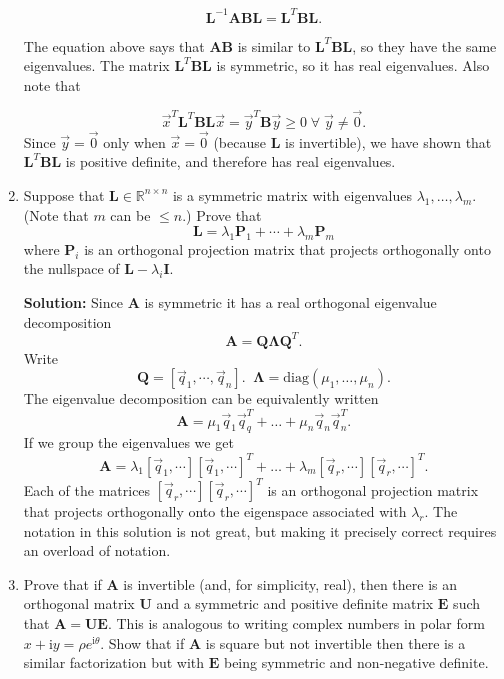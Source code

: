 \documentclass[11pt,fleqn]{article}
\newcommand{\imag}{\mathrm{i}}
\begin{document}
\begin{enumerate}
\[\mathbf{L}^{-1}\mathbf{ABL} = \mathbf{L}^T\mathbf{B}\mathbf{L}.\]

The equation above says that $\mathbf{AB}$ is similar to $\mathbf{L}^T\mathbf{B}\mathbf{L}$, so they have the same eigenvalues.
The matrix $\mathbf{L}^T\mathbf{B}\mathbf{L}$ is symmetric, so it has real eigenvalues. Also note that

\[\vec{x}^T\mathbf{L}^T\mathbf{B}\mathbf{L}\vec{x} = \vec{y}^T\mathbf{B}\vec{y}\ge0\;\forall\;\vec{y}\neq \vec{0}.\]
Since $\vec{y}=\vec{0}$ only when $\vec{x}=\vec{0}$ (because $\mathbf{L}$ is invertible), we have shown that $\mathbf{L}^T\mathbf{B}\mathbf{L}$ is positive definite, and therefore has real eigenvalues.

\item Suppose that $\mathbf{L}\in\mathbb{R}^{n\times n}$ is a symmetric matrix with eigenvalues $\lambda_1,\ldots,\lambda_m$. (Note that $m$ can be $\le n$.) Prove that
\[\mathbf{L} = \lambda_1 \mathbf{P}_1 + \cdots+\lambda_m\mathbf{P}_m\]
where $\mathbf{P}_i$ is an orthogonal projection matrix that projects orthogonally onto the nullspace of $\mathbf{L} - \lambda_i\mathbf{I}$.

{\bf Solution:} Since {\bf A} is symmetric it has a real orthogonal eigenvalue decomposition
\[\mathbf{A} = \mathbf{Q\Lambda Q}^T.\]
Write
\[\mathbf{Q} = [\vec{q}_1,\cdots,\vec{q}_n].\;\;\mathbf{\Lambda} = \text{diag}(\mu_1,\ldots,\mu_n).\]
The eigenvalue decomposition can be equivalently written
\[\mathbf{A} = \mu_1\vec{q}_1\vec{q}_q^T + \ldots + \mu_n\vec{q}_n\vec{q}_n^T.\]
If we group the eigenvalues we get
\[\mathbf{A} = \lambda_1 [\vec{q}_1,\cdots][\vec{q}_1,\cdots]^T+\ldots + \lambda_m[\vec{q}_r,\cdots][\vec{q}_r,\cdots]^T.\]
Each of the matrices $[\vec{q}_r,\cdots][\vec{q}_r,\cdots]^T$ is an orthogonal projection matrix that projects orthogonally onto the eigenspace associated with $\lambda_r$.
The notation in this solution is not great, but making it precisely correct requires an overload of notation.

\item Prove that if $\mathbf{A}$ is invertible (and, for simplicity, real), then there is an orthogonal matrix $\mathbf{U}$ and a symmetric and positive definite matrix $\mathbf{E}$ such that $\mathbf{A} = \mathbf{UE}$. This is analogous to writing complex numbers in polar form $x+\imag y = \rho e^{\imag \theta}$. Show that if $\mathbf{A}$ is square but not invertible then there is a similar factorization but with $\mathbf{E}$ being symmetric and non-negative definite.


\end{enumerate}
\end{document}
